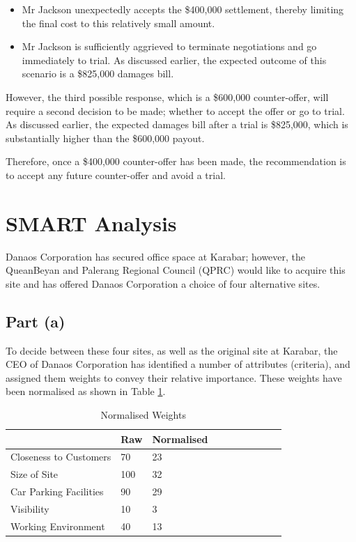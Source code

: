 \documentclass[11pt, a4paper]{article}
\begin{document}
    \begin{itemize}
        \item Mr Jackson unexpectedly accepts the \$400,000 settlement, thereby limiting the final cost to this relatively small amount.
        \item Mr Jackson is sufficiently aggrieved to terminate negotiations and go immediately to trial. As discussed earlier, the expected outcome of this scenario is a \$825,000 damages bill.
    \end{itemize} 

    However, the third possible response, which is a \$600,000 counter-offer, will require a second decision to be made; whether to accept the offer or go to trial. As discussed earlier, the expected damages bill after a trial is \$825,000, which is substantially higher than the \$600,000 payout. 

    Therefore, once a \$400,000 counter-offer has been made, the recommendation is to accept any future counter-offer and avoid a trial.

    \section{SMART Analysis}
    
    Danaos Corporation has secured office space at Karabar; however, the QueanBeyan and Palerang Regional Council (QPRC) would like to acquire this site and has offered Danaos Corporation a choice of four alternative sites.

    \subsection*{Part (a)}

    To decide between these four sites, as well as the original site at Karabar, the CEO of Danaos Corporation has identified a number of attributes (criteria), and assigned them weights to convey their relative importance. These weights have been normalised as shown in Table \ref{t1}.

    \begin{table}[!ht]
        \centering
        \begin{tabular}{|l|l|l|l|l|l|l|l|l|l|}
        \hline
            ~ & Raw & Normalised         \\ \hline
            Closeness to Customers & 70 & 23         \\ \hline
            Size of Site & 100 & 32         \\ \hline
            Car Parking Facilities & 90 & 29         \\ \hline
            Visibility & 10 & 3         \\ \hline
            Working Environment & 40 & 13         \\ \hline
        \end{tabular}
        \caption{Normalised Weights}
        \label{t1}
    \end{table}
\end{document}
